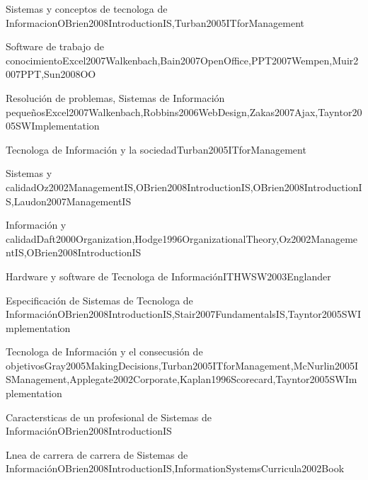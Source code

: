 \begin{LU1}{Sistemas y conceptos de tecnolog­a de Informacion}{OBrien2008IntroductionIS,Turban2005ITforManagement}{}
\begin{LU2}{Software de trabajo de conocimiento}{Excel2007Walkenbach,Bain2007OpenOffice,PPT2007Wempen,Muir2007PPT,Sun2008OO}{}
\begin{LU3}{Resolución de problemas, Sistemas de Información pequeños}{Excel2007Walkenbach,Robbins2006WebDesign,Zakas2007Ajax,Tayntor2005SWImplementation}{}
\begin{LU4}{Tecnolog­a de Información y la sociedad}{Turban2005ITforManagement}{}
\begin{LU5}{Sistemas y calidad}{Oz2002ManagementIS,OBrien2008IntroductionIS,OBrien2008IntroductionIS,Laudon2007ManagementIS}{}
\begin{LU6}{Información y calidad}{Daft2000Organization,Hodge1996OrganizationalTheory,Oz2002ManagementIS,OBrien2008IntroductionIS}{}
\begin{LU7}{Hardware y software de Tecnolog­a de Información}{ITHWSW2003Englander}{}
\begin{LU8}{Especificación de Sistemas de Tecnolog­a de Información}{OBrien2008IntroductionIS,Stair2007FundamentalsIS,Tayntor2005SWImplementation}{}
\begin{LU9}{Tecnolog­a de Información y el consecusión de objetivos}{Gray2005MakingDecisions,Turban2005ITforManagement,McNurlin2005ISManagement,Applegate2002Corporate,Kaplan1996Scorecard,Tayntor2005SWImplementation}{}
\begin{LU10}{Caracter­sticas de un profesional de Sistemas de Información}{OBrien2008IntroductionIS}{}
\begin{LU11}{L­nea de carrera de carrera de Sistemas de Información}{OBrien2008IntroductionIS,InformationSystemsCurricula2002Book}{}
\end{LU11}
\end{LU10}
\end{LU9}
\end{LU8}
\end{LU7}
\end{LU6}
\end{LU5}
\end{LU4}
\end{LU3}
\end{LU2}
\end{LU1}
